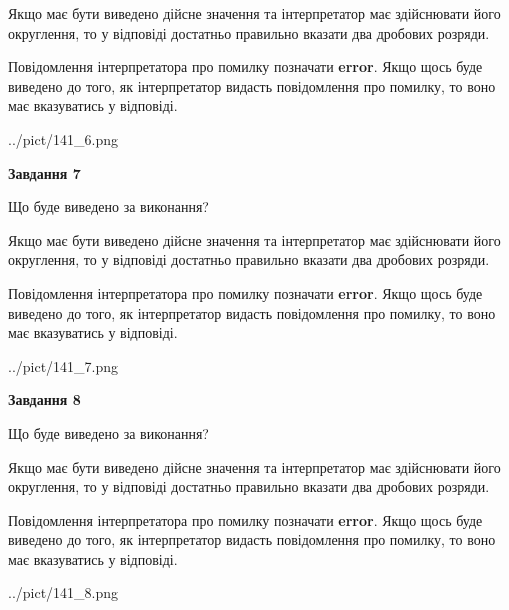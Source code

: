 \documentclass[12pt, ukrainian]{article}
\begin{document}
{\begin {Large}
Якщо має бути виведено дійсне значення та інтерпретатор має здійснювати його округлення, 
то у відповіді достатньо правильно вказати два дробових розряди.

Повідомлення інтерпретатора про помилку позначати \textbf{error}.
Якщо щось буде виведено до того, як інтерпретатор видасть повідомлення про помилку, 
то воно має вказуватись у відповіді. \par

\begin{center}
	{../pict/141_6.png}
\end{center}
\newpage

{\begin {center}\textbf{Завдання 7}\end {center}}\par
Що буде виведено за виконання? \par

Якщо має бути виведено дійсне значення та інтерпретатор має здійснювати його округлення, 
то у відповіді достатньо правильно вказати два дробових розряди.

Повідомлення інтерпретатора про помилку позначати \textbf{error}.
Якщо щось буде виведено до того, як інтерпретатор видасть повідомлення про помилку, 
то воно має вказуватись у відповіді. \par

\begin{center}
	{../pict/141_7.png}
\end{center}
\newpage

{\begin {center}\textbf{Завдання 8}\end {center}}\par
Що буде виведено за виконання? \par

Якщо має бути виведено дійсне значення та інтерпретатор має здійснювати його округлення, 
то у відповіді достатньо правильно вказати два дробових розряди.

Повідомлення інтерпретатора про помилку позначати \textbf{error}.
Якщо щось буде виведено до того, як інтерпретатор видасть повідомлення про помилку, 
то воно має вказуватись у відповіді. \par

\begin{center}
	{../pict/141_8.png}
\end{center}
\newpage


\end{Large}}
\end{document}
